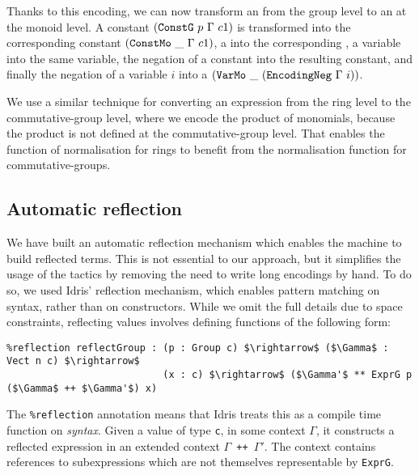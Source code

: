 Thanks to this encoding, we can now transform an  from the group
level to an  at the monoid level. A constant $({\mbox{\texttt{ConstG}}}\ p\
\Gamma\ c1)$ is transformed into the corresponding constant
$({\mbox{\texttt{ConstMo}}}\ \_\ \Gamma\ c1)$, a  into the corresponding
\code{PlusMo}, a variable into the same variable, the negation of a
constant into the resulting constant, and finally the negation of a variable
$i$ into a $(\code{VarMo}\ \_\ (\code{EncodingNeg}\ \Gamma\ i))$.

We use a similar technique for converting an expression from the ring level
to the commutative-group level, where we encode the product of monomials,
because the product is not defined at the commutative-group level.
That enables the function of normalisation for rings to benefit from the
normalisation function for commutative-groups.


\subsection{Automatic reflection}
		
We have built an automatic reflection mechanism which enables the machine to
build reflected terms. This is not essential to our
approach, but it simplifies the usage of the tactics by removing the need to
write long encodings by hand.  To do so, we used Idris' reflection mechanism,
which enables pattern matching on syntax, rather than on constructors. 
While we omit the full details due to space constraints, reflecting values
involves defining functions of the following form:

\begin{lstlisting}
%reflection reflectGroup : (p : Group c) $\rightarrow$ ($\Gamma$ : Vect n c) $\rightarrow$ 
                           (x : c) $\rightarrow$ ($\Gamma'$ ** ExprG p ($\Gamma$ ++ $\Gamma'$) x)
\end{lstlisting}

The \texttt{\%reflection} annotation means that Idris treats this as a 
compile time function on \emph{syntax}. Given a value of type
\texttt{c}, in some context $\Gamma$, it constructs a reflected expression 
in an extended context \texttt{$\Gamma$ ++ $\Gamma'$}. The context
contains references to subexpressions 
which are not themselves representable by \texttt{ExprG}.

